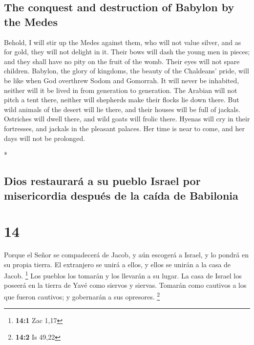 \begin{paracol}{2}
\begin{otherlanguage}{english}
\hypertarget{the-conquest-and-destruction-of-babylon-by-the-medes}{%
\subsection{The conquest and destruction of Babylon by the
Medes}\label{the-conquest-and-destruction-of-babylon-by-the-medes}}

 Behold, I will stir up the Medes against them, who will
not value silver, and as for gold, they will not delight in it.
 Their bows will dash the young men in pieces; and they
shall have no pity on the fruit of the womb. Their eyes will not spare
children.  Babylon, the glory of kingdoms, the beauty of
the Chaldeans' pride, will be like when God overthrew Sodom and
Gomorrah.  It will never be inhabited, neither will it be
lived in from generation to generation. The Arabian will not pitch a
tent there, neither will shepherds make their flocks lie down there.
 But wild animals of the desert will lie there, and their
houses will be full of jackals. Ostriches will dwell there, and wild
goats will frolic there.  Hyenas will cry in their
fortresses, and jackals in the pleasant palaces. Her time is near to
come, and her days will not be prolonged.

\end{otherlanguage}

\switchcolumn[0]*

\hypertarget{dios-restauraruxe1-a-su-pueblo-israel-por-misericordia-despuuxe9s-de-la-cauxedda-de-babilonia}{%
\subsection{Dios restaurará a su pueblo Israel por misericordia después
de la caída de
Babilonia}\label{dios-restauraruxe1-a-su-pueblo-israel-por-misericordia-despuuxe9s-de-la-cauxedda-de-babilonia}}

\hypertarget{section-26}{%
\section{14}\label{section-26}}

 Porque el Señor se compadecerá de Jacob, y aún escogerá a
Israel, y lo pondrá en su propia tierra. El extranjero se unirá a ellos,
y ellos se unirán a la casa de Jacob. \footnote{\textbf{14:1} Zac 1,17}
 Los pueblos los tomarán y los llevarán a su lugar. La
casa de Israel los poseerá en la tierra de Yavé como siervos y siervas.
Tomarán como cautivos a los que fueron cautivos; y gobernarán a sus
opresores. \footnote{\textbf{14:2} Is 49,22}


\end{paracol}
